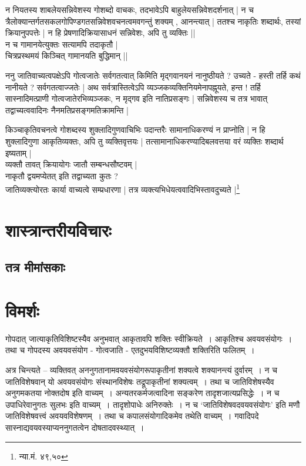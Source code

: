 न नियतस्य शाबलेयसन्निवेशस्य गोशब्दो वाचकः, तदभावेऽपि बाहुलेयसन्निवेशदर्शनात् | न च त्रैलोक्यान्तर्गतसकलगोपिण्डगतसन्निवेशवचनत्वमवगन्तुं शक्यम् , आनन्त्यात् | ततश्च नाकृतिः शब्दार्थः, तस्यां क्रियानुपपत्तेः | न हि प्रेषणादिक्रियासाधनं सन्निवेशः, अपि तु व्यक्तिः ||\\ न च गामानयेत्युक्तः सत्यामपि तदाकृतौ |\\ चित्रप्रस्थमयं किञ्चित् गामानयति बुद्धिमान् ||



ननु जातिवाच्यत्वपक्षेऽपि गोत्वजातेः सर्वगतत्वात् किमिति मृद्गवानयनं नानुष्ठीयते ? उच्यते - हस्ती तर्हि कथं नानीयते ? सर्वगतत्वाज्जतेः | अथ सर्वत्रास्तित्वेऽपि व्यञ्जकव्यक्तिनियमेनापह्नूयते, हन्त ! तर्हि सास्नादिमत्प्राणी गोत्वजातेरभिव्यञ्जकः, न मृद्गव इति नातिप्रसङ्गः | सन्निवेशस्य च तत्र भावात् तद्वाच्यत्ववादिनः नैनमतिप्रसङ्गमतिक्रामन्ति | 

किञ्चाकृतिवचनत्वे गोशब्दस्य शुक्लादिगुणवाचिभिः पदान्तरैः सामानाधिकरण्यं न प्राप्नोति | न हि शुक्लादिगुणा आकृतिव्यक्तः, अपि तु व्यक्तिवृत्तयः | तत्सामानाधिकरण्यादिबलवत्तया वरं व्यक्तिः शब्दार्थ इष्यताम् |\\ व्यक्तौ तावत् क्रियायोगः जातौ सम्बन्धसौष्टवम् |\\ नाकृतौ द्वयमप्येतत् इति तद्वाच्यता कुतः ?\\ जातिव्यक्त्योरतः कार्या वाच्यत्वे सम्प्रधारणा | तत्र व्यक्त्यभिधेयत्ववादिभिस्तावदुच्यते |\footnote{न्या.मं. ४९,५०}



\section{शास्त्रान्तरीयविचारः}

\subsection{तत्र मीमांसकाः} 

\section{विमर्शः}
गोपदात् जात्याकृतिविशिष्टस्यैव अनुभवात् आकृतावपि शक्तिः स्वीक्रियते~। आकृतिश्च अवयवसंयोगः~।  तथा च गोपदस्य अवयवसंयोग - गोत्वजाति - एतदुभयविशिष्टव्यक्तौ शक्तिरिति फलितम्~।
		
अत्र चिन्त्यते – व्यक्तिवत् अननुगतानामवयवसंयोगरूपाकृतीनां शक्यत्वे शक्यानन्त्यं दुर्वारम्~। न च जातिविशेषवान् यो अवयवसंयोगः संस्थानविशेषः तद्रूपाकृतीनां शक्यत्वम्~। तथा च जातिविशेषस्यैव अनुगमकतया नोक्तदोष इति वाच्यम्~। अन्यतरकर्मजत्वादिना सङ्करेण तादृशजात्यप्रसिद्धेः~। न च उपाधिरेवानुगतः सुलभः इति वाच्यम्~। तादृशोपाधेः अनिरुक्तेः~। न च ‘जातिविशेषवदवयवसंयोगः’ इति मणौ जातिविशेषवत्त्वं अवयवविशेषणम्~। तथा च कपालसंयोगादिकमेव तथेति वाच्यम्~। गवादिपदे सास्नाद्यवयवस्याप्यननुगतत्वेन दोषतादवस्थ्यात्~। 


